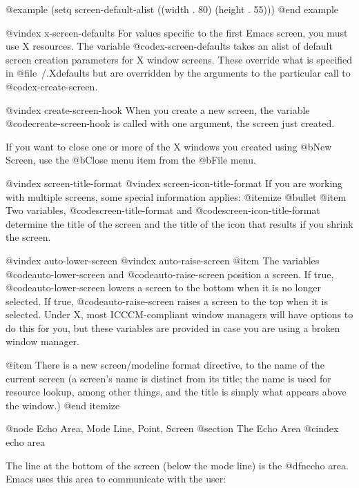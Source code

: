 @example
  (setq screen-default-alist ((width . 80) (height . 55)))
@end example

@vindex x-screen-defaults
For values specific to the first Emacs screen, you must use X resources.
The variable @code{x-screen-defaults} takes an alist of default screen
creation parameters for X window screens.  These override what is
specified in @file{~/.Xdefaults} but are overridden by the arguments to
the particular call to @code{x-create-screen}.

@vindex create-screen-hook
When you create a new screen, the variable @code{create-screen-hook}
is called with one argument, the screen just created.

If you want to close one or more of the X windows you created using
@b{New Screen}, use the @b{Close} menu item from the @b{File} menu.  

@vindex screen-title-format
@vindex screen-icon-title-format
If you are working with multiple screens, some special information
applies:
@itemize @bullet
@item Two variables, @code{screen-title-format} and
@code{screen-icon-title-format} determine the title of the screen and the
title of the icon that results if you shrink the screen. 

@vindex auto-lower-screen
@vindex auto-raise-screen
@item The variables @code{auto-lower-screen} and
@code{auto-raise-screen} position a screen. If true,
@code{auto-lower-screen} lowers a screen to the bottom when it is no longer
selected. If true, @code{auto-raise-screen} raises a screen to
the top when it is selected. Under X, most ICCCM-compliant window managers
will have options to do this for you, but these variables are provided in
case you are using a broken window manager.

@item There is a new screen/modeline format directive, %
to the name of the current screen (a screen's name is distinct from its
title; the name is used for resource lookup, among other things, and the
title is simply what appears above the window.)
@end itemize


@node Echo Area, Mode Line, Point, Screen
@section The Echo Area
@cindex echo area

  The line at the bottom of the screen (below the mode line) is the
@dfn{echo area}.  Emacs uses this area to communicate with the user:

